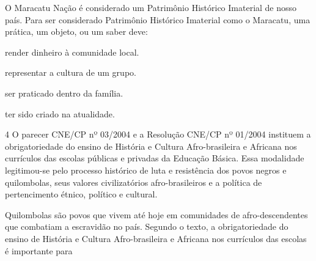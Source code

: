 O Maracatu Nação é considerado um Patrimônio Histórico Imaterial de
nosso país. Para ser considerado Patrimônio Histórico Imaterial como o
Maracatu, uma prática, um objeto, ou um saber deve:

\begin{escolha}
\item render dinheiro à comunidade local.

\item representar a cultura de um grupo.

\item ser praticado dentro da família.

\item ter sido criado na atualidade.
\end{escolha}


\num{4} O parecer CNE/CP nº 03/2004 e a Resolução CNE/CP nº 01/2004 instituem a
obrigatoriedade do ensino de História e Cultura Afro-brasileira e
Africana nos currículos das escolas públicas e privadas da Educação
Básica. Essa modalidade legitimou-se pelo processo histórico de luta e
resistência dos povos negros e quilombolas, seus valores civilizatórios
afro-brasileiros e a política de pertencimento étnico, político e
cultural.


Quilombolas são povos que vivem até hoje em comunidades de
afro-descendentes que combatiam a escravidão no país. Segundo o texto, a
obrigatoriedade do ensino de História e Cultura Afro-brasileira e
Africana nos currículos das escolas é importante para


